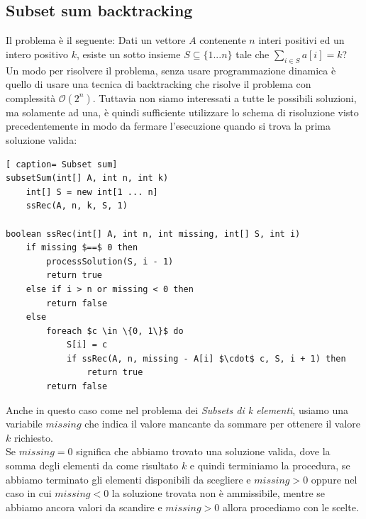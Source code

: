 \documentclass[../cheatSheetAlgoritmi.tex]{subfiles}
\begin{document}
\subsection{Subset sum backtracking}
Il problema è il seguente: Dati un vettore $A$ contenente $n$ interi positivi ed un intero positivo $k$, esiste un sotto insieme $S \subseteq \{1. . . n\}$ tale che $\sum_{i \in S} a[i] = k$? \\
Un modo per risolvere il problema, senza usare programmazione dinamica è quello di usare una tecnica di backtracking che risolve il problema con complessità $\mathcal{O}(2^n)$. Tuttavia non siamo interessati a tutte le possibili soluzioni, ma solamente ad una, è quindi sufficiente utilizzare lo schema di risoluzione visto precedentemente in modo da fermare l'esecuzione quando si trova la prima soluzione valida:
 \begin{lstlisting}[ caption= Subset sum]
subsetSum(int[] A, int n, int k)
	int[] S = new int[1 ... n]
	ssRec(A, n, k, S, 1)

boolean ssRec(int[] A, int n, int missing, int[] S, int i)
	if missing $==$ 0 then
		processSolution(S, i - 1)
		return true
	else if i > n or missing < 0 then
		return false
	else 
		foreach $c \in \{0, 1\}$ do
			S[i] = c
			if ssRec(A, n, missing - A[i] $\cdot$ c, S, i + 1) then
				return true
		return false
\end{lstlisting}
Anche in questo caso come nel problema dei \emph{Subsets di k elementi}, usiamo una variabile $missing$ che indica il valore mancante da sommare per ottenere il valore $k$ richiesto. \\
Se $missing = 0$ significa che abbiamo trovato una soluzione valida, dove la somma degli elementi da come risultato $k$ e quindi terminiamo la procedura, se abbiamo terminato gli elementi disponibili da scegliere e $missing > 0$ oppure nel caso in cui $missing < 0$ la soluzione trovata non è ammissibile, mentre se abbiamo ancora valori da scandire e $missing > 0$ allora procediamo con le scelte.
\end{document}
